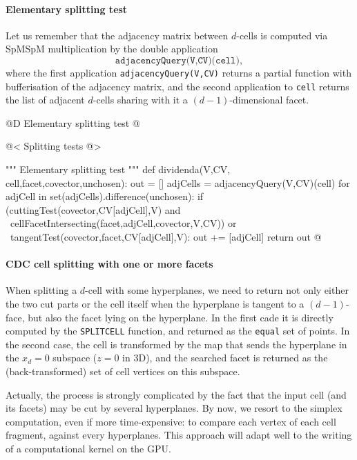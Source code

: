 \documentclass[11pt,oneside]{article}	%
\begin{document}
\paragraph{Elementary splitting test}

Let us remember that the adjacency matrix between $d$-cells is computed via SpMSpM multiplication by the double application 
\[
\texttt{adjacencyQuery(V,CV)(cell)}, 
\] 
where the first application \texttt{adjacencyQuery(V,CV)}
returns a partial function with bufferisation of the adjacency matrix, and the second application to \texttt{cell} returns the list of adjacent $d$-cells sharing with it a $(d-1)$-dimensional facet.

@D Elementary splitting test
@{
@< Splitting tests @>

""" Elementary splitting test """
def dividenda(V,CV, cell,facet,covector,unchosen):
	out = []
	adjCells = adjacencyQuery(V,CV)(cell)
	for adjCell in set(adjCells).difference(unchosen):
		if (cuttingTest(covector,CV[adjCell],V) and \
			cellFacetIntersecting(facet,adjCell,covector,V,CV)) or \
			tangentTest(covector,facet,CV[adjCell],V): out += [adjCell]
	return out
@}

\paragraph{CDC cell splitting with one or more facets}

When splitting a $d$-cell with some hyperplanes, we need to return not only either the two cut parts or the cell itself when the hyperplane is tangent to a $(d-1)$-face, but also the facet lying on the hyperplane. 
In the first cade it is directly computed by the \texttt{SPLITCELL} function, and returned as the \texttt{equal} set of points. In the second case, the cell is transformed by the map that sends the hyperplane in the $x_d=0$ subspace ($z=0$ in 3D), and the searched facet is returned as the (back-transformed) set of cell vertices on this subspace. 

Actually, the process is strongly complicated by the fact that the input cell (and its facets) may be cut by several hyperplanes. By now, we resort to the simplex computation, even if more time-expensive:  to compare each vertex of each cell fragment, against every hyperplanes. This approach will adapt well to the writing of a computational kernel on the GPU.
\end{document}

